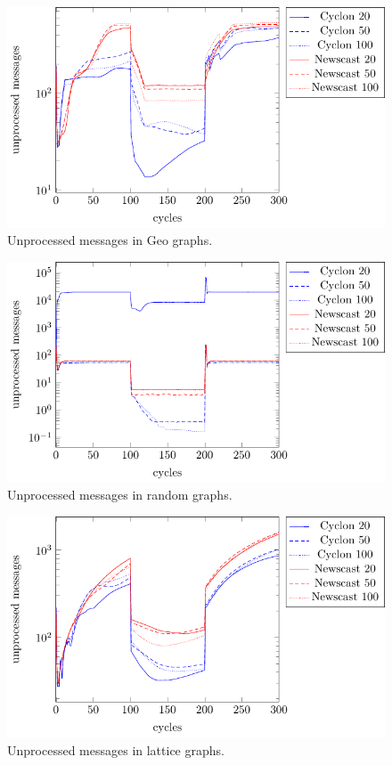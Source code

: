 \documentclass[a4paper]{ifacconf}
\begin{document}
\begin{figure}[p]
    \centering
    \includegraphics[width=.9\linewidth]{"figures/unprocessed_messages/unprocessed messages geo"}
    \caption{Unprocessed messages in Geo graphs.}
    \label{fig:unprocessed-messages-geo}
\end{figure}
\begin{figure}[p]
    \centering
    \includegraphics[width=.9\linewidth]{"figures/unprocessed_messages/unprocessed messages random"}
    \caption{Unprocessed messages in random graphs.}
    \label{fig:unprocessed-messages-random}
\end{figure}
\begin{figure}[p]
    \centering
    \includegraphics[width=.9\linewidth]{"figures/unprocessed_messages/unprocessed messages lattice"}
    \caption{Unprocessed messages in lattice graphs.}
    \label{fig:unprocessed-messages-lattice}
\end{figure}
\end{document}
